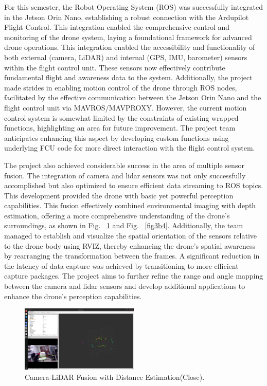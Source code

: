 For this semester, the Robot Operating System (ROS)  was successfully integrated in the Jetson Orin Nano, establishing a robust connection with the Ardupilot Flight Control. This integration enabled the comprehensive control and monitoring of the drone system, laying a foundational framework for advanced drone operations. This integration enabled the accessibility and functionality of both external (camera, LiDAR) and internal (GPS, IMU, barometer) sensors within the flight control unit. These sensors now effectively contribute fundamental flight and awareness data to the system. Additionally, the project made strides in enabling motion control of the drone through ROS nodes, facilitated by the effective communication between the Jetson Orin Nano and the flight control unit via MAVROS/MAVPROXY. However, the current motion control system is somewhat limited by the constraints of existing wrapped functions, highlighting an area for future improvement. The project team anticipates enhancing this aspect by developing custom functions using underlying FCU code for more direct interaction with the flight control system.

The project also achieved considerable success in the area of multiple sensor fusion. The integration of camera and lidar sensors was not only successfully accomplished but also optimized to ensure efficient data streaming to ROS topics. This development provided the drone with basic yet powerful perception capabilities. This fusion effectively combined environmental imaging with depth estimation, offering a more comprehensive understanding of the drone's surroundings, as shown in Fig. ~\ref{fig3b3} and  
Fig. ~\ref{fig3b4}. Additionally, the team managed to establish and visualize the spatial orientation of the sensors relative to the drone body using RVIZ, thereby enhancing the drone's spatial awareness by rearranging the transformation between the frames. A significant reduction in the latency of data capture was achieved by transitioning to more efficient capture packages. The project aims to further refine the range and angle mapping between the camera and lidar sensors and develop additional applications to enhance the drone's perception capabilities.

\begin{figure}[H]
    \centerline{\includegraphics[width=0.5\textwidth]{Figures/Results/fusion5_with_distance.png}}
    \caption{Camera-LiDAR Fusion with Distance Estimation(Close).}
    \label{fig3b3}
\end{figure}


